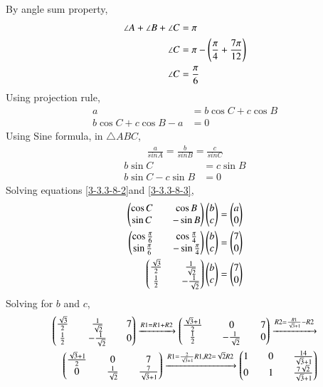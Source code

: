 \documentclass[journal]{IEEEtran}
\begin{document}
By angle sum property,
\begin{align}
    \angle{A}+\angle{B}+\angle{C}&=\pi\\
    \angle{C}&=\pi-\left(\frac{\pi}{4}+\frac{7\pi}{12}\right)\\
    \angle{C}&=\frac{\pi}{6}\label{3-3.3-8-1}
\end{align}
Using projection rule,
\begin{align}
    a&=b \cos C+c \cos B\\
    b\cos C+c\cos B-a&=0\label{3-3.3-8-2}
\end{align}
Using Sine formula, in $\triangle ABC$,
\begin{align}
    \frac{a}{sin A}=\frac{b}{sin B}=\frac{c}{sin C}
\end{align}
 \begin{align}
    b\sin C&= c\sin B\\
    b\sin C - c\sin B &=0\label{3-3.3-8-3}
\end{align}
 Solving equations \eqref{3-3.3-8-2}and \eqref{3-3.3-8-3},
\begin{align}
\begin{pmatrix}\cos C && \cos B\\ \sin C && -\sin B\end{pmatrix}\begin{pmatrix}b \\ c\end{pmatrix}=\begin{pmatrix}a \\ 0\end{pmatrix}\\
\begin{pmatrix}\cos \frac{\pi}{6} && \cos \frac{\pi}{4}\\ \sin \frac{\pi}{6} && -\sin\frac{\pi}{4}\end{pmatrix}\begin{pmatrix}b \\ c\end{pmatrix}=\begin{pmatrix}7 \\ 0\end{pmatrix}\\
\begin{pmatrix}\frac{\sqrt{3}}{2} && \frac{1}{\sqrt{2}}\\ \frac{1}{2} && -\frac{1}{\sqrt{2}}\end{pmatrix}\begin{pmatrix}b \\ c\end{pmatrix}=\begin{pmatrix}7 \\ 0\end{pmatrix}
\end{align}
Solving for $b$ and $c$,
\begin{align}
    \begin{pmatrix}\frac{\sqrt{3}}{2} && \frac{1}{\sqrt{2}} && 7 \\ \frac{1}{2} && -\frac{1}{\sqrt{2}} && 0\end{pmatrix}\xrightarrow{R1=R1+R2}\begin{pmatrix}\frac{\sqrt{3}+1}{2} && 0 && 7 \\ \frac{1}{2} && -\frac{1}{\sqrt{2}} && 0\end{pmatrix}\xrightarrow{R2=\frac{R1}{\sqrt{3}+1}-R2}\\\begin{pmatrix}\frac{\sqrt{3}+1}{2} && 0 && 7 \\ 0 && \frac{1}{\sqrt{2}} && \frac{7}{\sqrt{3}+1}\end{pmatrix}\xrightarrow{R1=\frac{2}{\sqrt{3}+1}R1, R2=\sqrt{2}R2}\begin{pmatrix}1 && 0 && \frac{14}{\sqrt{3}+1} \\ 0 && 1 && \frac{7\sqrt{2}}{\sqrt{3}+1}\end{pmatrix}
\end{align}
\end{document}
